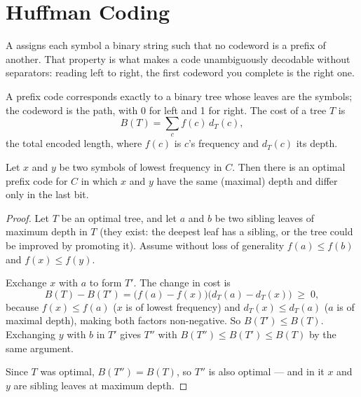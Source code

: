 \section{Huffman Coding}

\begin{definitionbox}
A  assigns each symbol a binary string such that no
codeword is a prefix of another. That property is what makes a code
unambiguously decodable without separators: reading left to right, the first
codeword you complete is the right one.

\smallskip
A prefix code corresponds exactly to a binary tree whose leaves are the
symbols; the codeword is the path, with 0 for left and 1 for right. The cost of
a tree $T$ is
\[ B(T) = \sum_{c} f(c)\, d_{T}(c), \]
the total encoded length, where $f(c)$ is $c$'s frequency and $d_{T}(c)$ its
depth.
\end{definitionbox}


\begin{lemma}\label{lem:huffman}
Let $x$ and $y$ be two symbols of lowest frequency in $C$. Then there is an
optimal prefix code for $C$ in which $x$ and $y$ have the same (maximal) depth
and differ only in the last bit.
\end{lemma}

\begin{proof}
Let $T$ be an optimal tree, and let $a$ and $b$ be two sibling leaves of
maximum depth in $T$ (they exist: the deepest leaf has a sibling, or the tree
could be improved by promoting it). Assume without loss of generality
$f(a) \le f(b)$ and $f(x) \le f(y)$.

\smallskip
Exchange $x$ with $a$ to form $T'$. The change in cost is
\[ B(T) - B(T') = \bigl(f(a) - f(x)\bigr)\bigl(d_{T}(a) - d_{T}(x)\bigr)
   \;\ge\; 0, \]
because $f(x) \le f(a)$ ($x$ is of lowest frequency) and
$d_{T}(x) \le d_{T}(a)$ ($a$ is of maximal depth), making both factors
non-negative. So $B(T') \le B(T)$. Exchanging $y$ with $b$ in $T'$ gives $T''$
with $B(T'') \le B(T') \le B(T)$ by the same argument.

\smallskip
Since $T$ was optimal, $B(T'') = B(T)$, so $T''$ is also optimal --- and in it
$x$ and $y$ are sibling leaves at maximum depth.
\end{proof}

